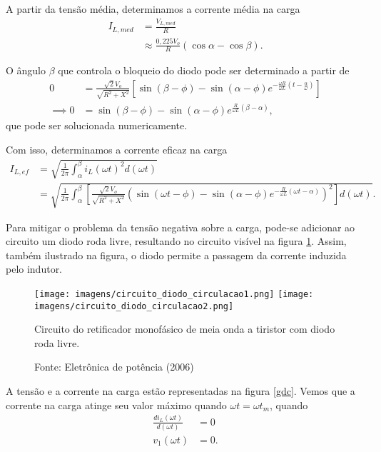 A partir da tensão média, determinamos a corrente média na carga 
\begin{align*}
    I_{L,med} &= \frac{V_{L,med}}{R} \\
    &\approx \frac{0,225 V_o}{R}(\cos\alpha - \cos\beta)
.\end{align*}

O ângulo $\beta$ que controla o bloqueio do diodo pode ser determinado a partir de
\begin{align*}
    0 &= \frac{\sqrt{2}V_o}{\sqrt{R^2 + X^2}} \left[  \sin{\left(\beta-\phi\right)} -\sin{\left(\alpha-\phi\right)}e^{-\frac{\omega{R}}{\omega{L}}\left(  t -\frac{\alpha}{\omega}\right)} \right]  \\
    \implies 0 &= \sin(\beta - \phi) - \sin(\alpha - \phi)e^{\frac{R}{\omega{L}}(\beta - \alpha)}
,\end{align*}
que pode ser solucionada numericamente.

Com isso, determinamos a corrente eficaz na carga
\begin{align*}
    I_{L,ef}&=\sqrt{\frac{1}{2\pi}\int_{\alpha}^{\beta}i_{L}(\omega{t})^{2}d(\omega{t})} \\
&=\sqrt{\frac{1}{2\pi}\int_{\alpha}^{\beta}\left[\frac{\sqrt{2}V_{o}}{\sqrt{R^2 + X^2}}\left(  \sin(\omega{t}- \phi) - \sin(\alpha - \phi)e^{-\frac{R}{\omega{L}}(\omega{t}-\alpha)}\right)  ^{2}  \right] d(\omega{t})}
.\end{align*}

Para mitigar o problema da tensão negativa sobre a carga, pode-se adicionar ao circuito um diodo roda livre, resultando no circuito visível na figura \ref{cdc1}. Assim, também ilustrado na figura, o diodo permite a passagem da corrente induzida pelo indutor.

\begin{figure}[h]
\center
\texttt{[image: imagens/circuito\_diodo\_circulacao1.png]}
\texttt{[image: imagens/circuito\_diodo\_circulacao2.png]}
\caption{Circuito do retificador monofásico de meia onda a tiristor com diodo roda livre.}\label{cdc1}
\caption*{Fonte: Eletrônica de potência (2006)}
\end{figure}


A tensão e a corrente na carga estão representadas na figura \ref{gdc}. Vemos que a corrente na carga atinge seu valor máximo quando $\omega{t} = \omega{t}_{m}$, quando
\begin{align*}
    \frac{di_{L}(\omega{t})}{d(\omega{t})}&=0   \\
v_{1}(\omega{t})&=0
.\end{align*}

